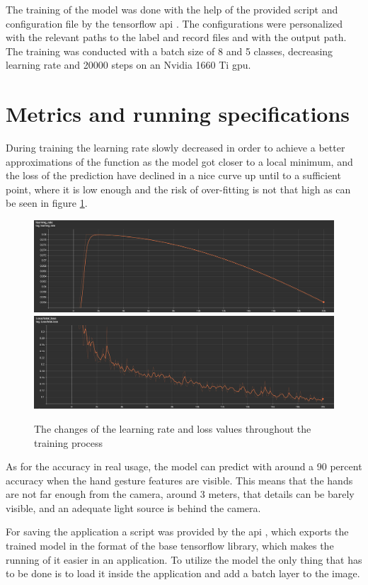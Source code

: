 \par The training of the model was done with the help of the provided script and configuration file by the tensorflow api \cite{trainingScript}. The configurations were personalized with the relevant paths to the label and record files and with the output path. The training was conducted with a batch size of 8 and 5 classes, decreasing learning rate and 20000 steps on an Nvidia 1660 Ti gpu.

\section{Metrics and running specifications}
\label{sec:modelsec4}

\par During training the learning rate slowly decreased in order to achieve a better approximations of the function as the model got closer to a local minimum, and the loss of the prediction have declined in a nice curve up until to a sufficient point, where it is low enough and the risk of over-fitting is not that high as can be seen in figure \ref{metrics}.

\begin{figure}
    \centering
    \includegraphics[width=0.4\linewidth]{figures/Learning-rate-graph.png}
    \includegraphics[width=0.4\linewidth]{figures/Loss-Graph.png}
    \caption{The changes of the learning rate and loss values throughout the training process}
    \label{metrics}
\end{figure}

\par As for the accuracy in real usage, the model can predict with around a 90 percent accuracy when the hand gesture features are visible. This means that the hands are not far enough from the camera, around 3 meters, that details can be barely visible, and an adequate light source is behind the camera.
\par For saving the application a script was provided by the api \cite{exportScript}, which exports the trained model in the format of the base tensorflow library, which makes the running of it easier in an application. To utilize the model the only thing that has to be done is to load it inside the application and add a batch layer to the image.